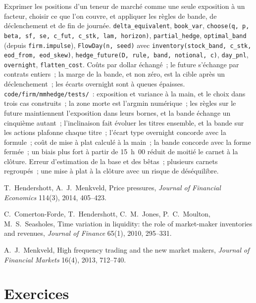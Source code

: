 \begin{build}
 Exprimer les positions d'un teneur de marché comme une seule exposition à un facteur, choisir ce que l'on couvre, et appliquer les règles de bande, de déclenchement et de fin de journée.
 \texttt{delta\_equivalent}, \texttt{book\_var}, \texttt{choose(q, p, beta, sf, se, c\_fut, c\_stk, lam, horizon)},
\texttt{partial\_hedge}, \texttt{optimal\_band} (depuis \texttt{firm.impulse}), \texttt{FlowDay(n, seed)} avec
\texttt{inventory(stock\_band, c\_stk, eod\_from, eod\_skew)}, \texttt{hedge\_future(D, rule, band, notional, c)}, \texttt{day\_pnl},
\texttt{overnight}, \texttt{flatten\_cost}.
 Coûts par dollar échangé~; le future s'échange par contrats entiers~; la marge de la bande, et non zéro, est la cible après un déclenchement~; les écarts overnight
sont à queues épaisses.
 \texttt{code/firm/mmhedge/tests/}~: exposition et variance à la main, et le choix dans trois cas construits~; la zone morte est
l'argmin numérique~; les règles sur le future maintiennent l'exposition dans leurs bornes, et la bande échange un cinquième autant~; l'inclinaison fait évoluer les titres ensemble, et la
bande sur les actions plafonne chaque titre~; l'écart type overnight concorde avec la formule~; coût de mise à plat calculé à la main~; la bande concorde avec la forme fermée~; un
biais plus fort à partir de 15~h~00 réduit de moitié le carnet à la clôture.
 Erreur d'estimation de la base et des bêtas~; plusieurs carnets regroupés~; une mise à plat à la clôture avec un risque de déséquilibre.
\end{build}

\begin{omsources}
\item T.~Hendershott, A.~J.~Menkveld, Price pressures, \emph{Journal of Financial Economics} 114(3), 2014, 405--423.
\item C.~Comerton-Forde, T.~Hendershott, C.~M.~Jones, P.~C.~Moulton, M.~S.~Seasholes, Time variation in liquidity: the role of market-maker
inventories and revenues, \emph{Journal of Finance} 65(1), 2010, 295--331.
\item A.~J.~Menkveld, High frequency trading and the new market makers, \emph{Journal of Financial Markets} 16(4), 2013, 712--740.
\end{omsources}

\section{Exercices}


